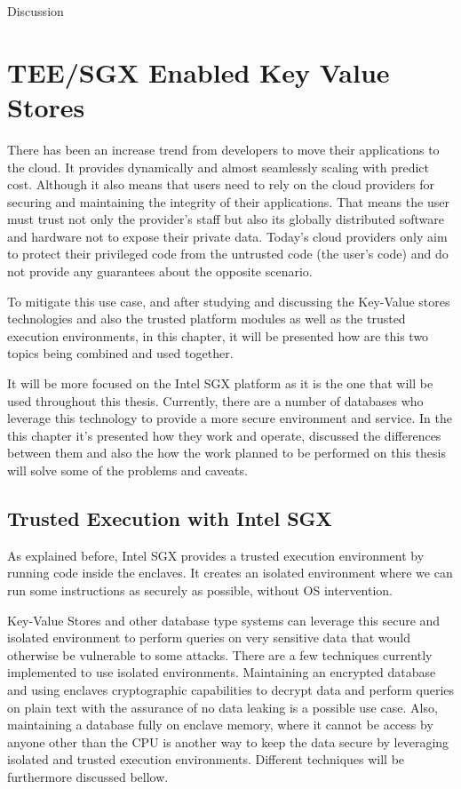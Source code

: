 Discussion

\section{TEE/SGX Enabled Key Value Stores} %
\label{sec:sgx_enabled_key_value_stores}

There has been an increase trend from developers to move their applications to the cloud. It provides dynamically and almost seamlessly scaling with predict cost. Although it also means that users need to rely on the cloud providers for securing and maintaining the integrity of their applications. That means the user must trust not only the provider's staff but also its globally distributed software and hardware not to expose their private data. Today's cloud providers only aim to protect their privileged code from the untrusted code (the user's code) and do not provide any guarantees about the opposite scenario.

To mitigate this use case, and after studying and discussing the Key-Value stores technologies and also the trusted platform modules as well as the trusted execution environments, in this chapter, it will be presented how are this two topics being combined and used together. 

It will be more focused on the Intel SGX platform as it is the one that will be used throughout this thesis. Currently, there are a number of databases who leverage this technology to provide a more secure environment and service. In the this chapter it's presented how they work and operate, discussed the differences between them and also the how the work planned to be performed on this thesis will solve some of the problems and caveats. 


\subsection{Trusted Execution with Intel SGX}
\label{ssec:trusted_execution_with_sgx}

As explained before, Intel SGX provides a trusted execution environment by running code inside the enclaves. It creates an isolated environment where we can run some instructions as securely as possible, without \gls{OS} intervention.

Key-Value Stores and other database type systems can leverage this secure and isolated environment to perform queries on very sensitive data that would otherwise be vulnerable to some attacks. There are a few techniques currently implemented to use isolated environments. Maintaining an encrypted database and using enclaves cryptographic capabilities to decrypt data and perform queries on plain text with the assurance of no data leaking is a possible use case. Also, maintaining a database fully on enclave memory, where it cannot be access by anyone other than the CPU is another way to keep the data secure by leveraging isolated and trusted execution environments. Different techniques will be furthermore discussed bellow. 

